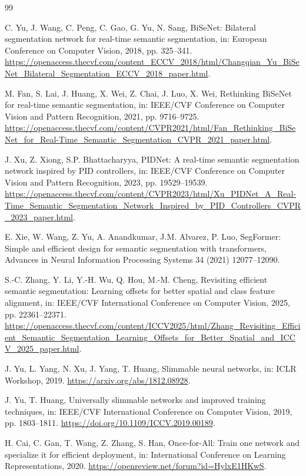 \documentclass[a4paper,review,12pt]{elsarticle}
\begin{document}
\begin{thebibliography}{99}

C. Yu, J. Wang, C. Peng, C. Gao, G. Yu, N. Sang,
BiSeNet: Bilateral segmentation network for real-time semantic segmentation,
in: European Conference on Computer Vision, 2018, pp. 325--341.
\url{https://openaccess.thecvf.com/content_ECCV_2018/html/Changqian_Yu_BiSeNet_Bilateral_Segmentation_ECCV_2018_paper.html}.

M. Fan, S. Lai, J. Huang, X. Wei, Z. Chai, J. Luo, X. Wei,
Rethinking BiSeNet for real-time semantic segmentation,
in: IEEE/CVF Conference on Computer Vision and Pattern Recognition, 2021, pp. 9716--9725.
\url{https://openaccess.thecvf.com/content/CVPR2021/html/Fan_Rethinking_BiSeNet_for_Real-Time_Semantic_Segmentation_CVPR_2021_paper.html}.

J. Xu, Z. Xiong, S.P. Bhattacharyya,
PIDNet: A real-time semantic segmentation network inspired by PID controllers,
in: IEEE/CVF Conference on Computer Vision and Pattern Recognition, 2023, pp. 19529--19539.
\url{https://openaccess.thecvf.com/content/CVPR2023/html/Xu_PIDNet_A_Real-Time_Semantic_Segmentation_Network_Inspired_by_PID_Controllers_CVPR_2023_paper.html}.

E. Xie, W. Wang, Z. Yu, A. Anandkumar, J.M. Alvarez, P. Luo,
SegFormer: Simple and efficient design for semantic segmentation with transformers,
Advances in Neural Information Processing Systems 34 (2021) 12077--12090.

S.-C. Zhang, Y. Li, Y.-H. Wu, Q. Hou, M.-M. Cheng,
Revisiting efficient semantic segmentation: Learning offsets for better spatial and class feature alignment,
in: IEEE/CVF International Conference on Computer Vision, 2025, pp. 22361--22371.
\url{https://openaccess.thecvf.com/content/ICCV2025/html/Zhang_Revisiting_Efficient_Semantic_Segmentation_Learning_Offsets_for_Better_Spatial_and_ICCV_2025_paper.html}.

J. Yu, L. Yang, N. Xu, J. Yang, T. Huang,
Slimmable neural networks,
in: ICLR Workshop, 2019.
\url{https://arxiv.org/abs/1812.08928}.

J. Yu, T. Huang,
Universally slimmable networks and improved training techniques,
in: IEEE/CVF International Conference on Computer Vision, 2019, pp. 1803--1811.
\url{https://doi.org/10.1109/ICCV.2019.00189}.

H. Cai, C. Gan, T. Wang, Z. Zhang, S. Han,
Once-for-All: Train one network and specialize it for efficient deployment,
in: International Conference on Learning Representations, 2020.
\url{https://openreview.net/forum?id=HylxE1HKwS}.


\end{thebibliography}
\end{document}
